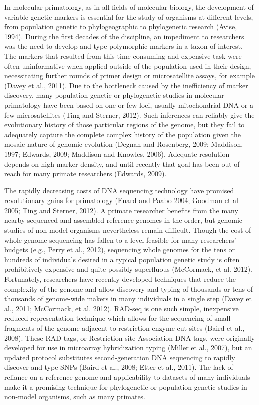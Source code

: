 \documentclass[12pt]{article}
\begin{document}
In molecular primatology, as in all fields of molecular biology, the development of variable genetic markers is essential for the study of organisms at different levels, from population genetic to phylogeographic to phylogenetic research (Avise, 1994). During the first decades of the discipline, an impediment to researchers was the need to develop and type polymorphic markers in a taxon of interest. The markers that resulted from this time-consuming and expensive task were often uninformative when applied outside of the population used in their design, necessitating further rounds of primer design or microsatellite assays, for example (Davey et al., 2011). Due to the bottleneck caused by the inefficiency of marker discovery, many population genetic or phylogenetic studies in molecular primatology have been based on one or few loci, usually mitochondrial DNA or a few microsatellites (Ting and Sterner, 2012). Such inferences can reliably give the evolutionary history of those particular regions of the genome, but they fail to adequately capture the complete complex history of the population given the mosaic nature of genomic evolution (Degnan and Rosenberg, 2009; Maddison, 1997; Edwards, 2009; Maddison and Knowles, 2006). Adequate resolution depends on high marker density, and until recently that goal has been out of reach for many primate researchers (Edwards, 2009).

The rapidly decreasing costs of DNA sequencing technology have promised revolutionary gains for primatology (Enard and Paabo 2004; Goodman et al 2005; Ting and Sterner, 2012). A primate researcher benefits from the many nearby sequenced and assembled reference genomes in the order, but genomic studies of non-model organisms nevertheless remain difficult. Though the cost of whole genome sequencing has fallen to a level feasible for many researchers' budgets (e.g., Perry et al., 2012), sequencing whole genomes for the tens or hundreds of individuals desired in a typical population genetic study is often prohibitively expensive and quite possibly superfluous (McCormack, et al. 2012). Fortunately, researchers have recently developed techniques that reduce the complexity of the genome and allow discovery and typing of thousands or tens of thousands of genome-wide makers in many individuals in a single step (Davey et al., 2011; McCormack, et al. 2012). RAD-seq is one such simple, inexpensive reduced representation technique which allows for the sequencing of small fragments of the genome adjacent to restriction enzyme cut sites (Baird et al., 2008). These RAD tags, or Restriction-site Association DNA tags, were originally developed for use in microarray hybridization typing (Miller et al., 2007), but an updated protocol substitutes second-generation DNA sequencing to rapidly discover and type SNPs (Baird et al., 2008; Etter et al., 2011). The lack of reliance on a reference genome and applicability to datasets of many individuals make it a promising technique for phylogenetic or population genetic studies in non-model organisms, such as many primates.
\end{document}
